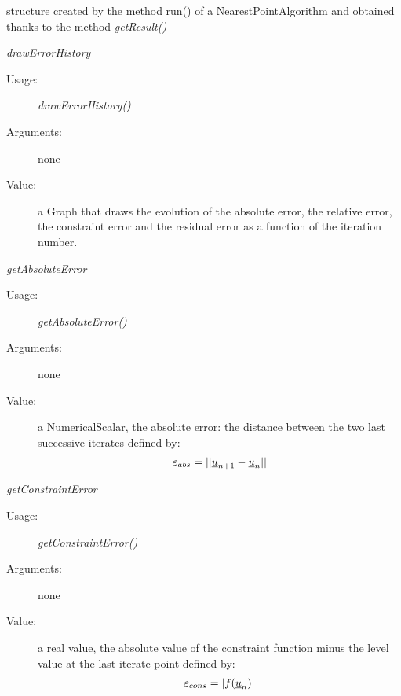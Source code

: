 \begin{description}
\item[Usage:] structure created by the method run() of a NearestPointAlgorithm and obtained thanks to the method \textit{getResult()}

\item[Some methods:]  \rule{0pt}{1em}

  \begin{description}

  \item \textit{drawErrorHistory}
    \begin{description}
    \item[Usage:] \textit{drawErrorHistory()}
    \item[Arguments:] none
    \item[Value:]  a Graph that draws the evolution of the absolute error, the relative error, the constraint error and the residual error as a function of the iteration number.
    \end{description}
    \bigskip

  \item \textit{getAbsoluteError}
    \begin{description}
    \item[Usage:] \textit{getAbsoluteError()}
    \item[Arguments:] none
    \item[Value:]  a NumericalScalar, the absolute error: the distance between the two last successive iterates defined by:
\begin{align}\label{absError}
\varepsilon_{abs} = ||{\underline{u}}_{n+1}-{\underline{u}}_n||
\end{align}

    \end{description}
    \bigskip

  \item \textit{getConstraintError}
    \begin{description}
    \item[Usage:] \textit{getConstraintError()}
    \item[Arguments:] none
    \item[Value:] a real value, the absolute value of the constraint function minus the level value at the last iterate point defined by:
\begin{align}\label{consError}
\varepsilon_{cons} = |f({\underline{u}}_{n})|
\end{align}

    \end{description}
    \bigskip


\end{description}
\end{description}
